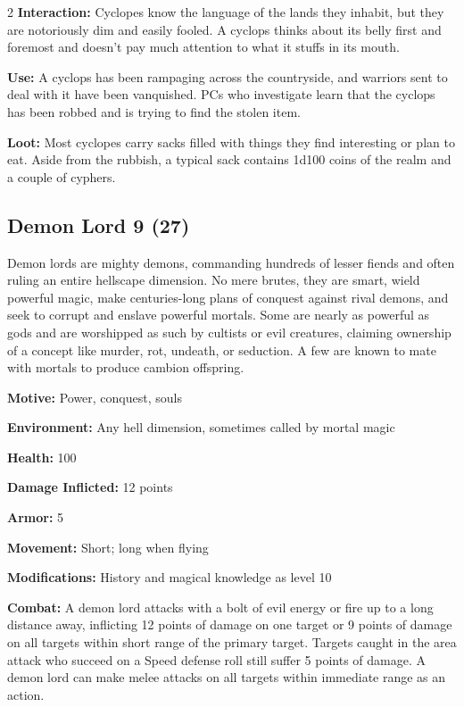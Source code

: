 \begin{multicols}{2}
\textbf{Interaction:} Cyclopes know the language of the lands they inhabit, but they are notoriously dim and easily fooled. A cyclops thinks about its belly first and foremost and doesn’t pay much attention to what it stuffs in its mouth. 

\textbf{Use:} A cyclops has been rampaging across the countryside, and warriors sent to deal with it have been vanquished. PCs who investigate learn that the cyclops has been robbed and is trying to find the stolen item. 

\textbf{Loot:} Most cyclopes carry sacks filled with things they find interesting or plan to eat. Aside from the rubbish, a typical sack contains 1d100 coins of the realm and a couple of cyphers.

\subsection{Demon Lord 9 (27)}


Demon lords are mighty demons, commanding hundreds of lesser fiends and often ruling an entire hellscape dimension. No mere brutes, they are smart, wield powerful magic, make centuries-long plans of conquest against rival demons, and seek to corrupt and enslave powerful mortals. Some are nearly as powerful as gods and are worshipped as such by cultists or evil creatures, claiming ownership of a concept like murder, rot, undeath, or seduction. A few are known to mate with mortals to produce cambion offspring. 

\textbf{Motive:} Power, conquest, souls 

\textbf{Environment:} Any hell dimension, sometimes called by mortal magic 

\textbf{Health:} 100

\textbf{Damage Inflicted:} 12 points 

\textbf{Armor:} 5 

\textbf{Movement:} Short; long when flying 

\textbf{Modifications:} History and magical knowledge as level 10

\textbf{Combat:} A demon lord attacks with a bolt of evil energy or fire up to a long distance away, inflicting 12 points of damage on one target or 9 points of damage on all targets within short range of the primary target. Targets caught in the area attack who succeed on a Speed defense roll still suffer 5 points of damage. A demon lord can make melee attacks on all targets within immediate range as an action. 


\end{multicols}
